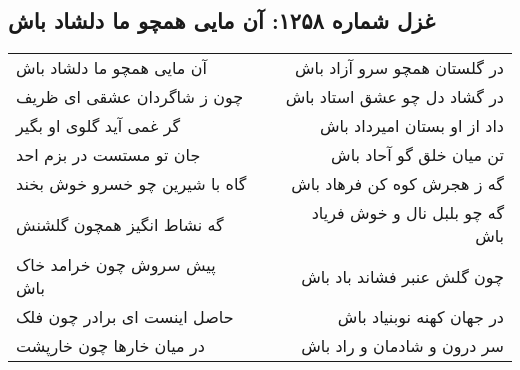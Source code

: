 \begin{center}
\section*{غزل شماره ۱۲۵۸: آن مایی همچو ما دلشاد باش}
\label{sec:1258}
\begin{longtable}{l p{0.5cm} r}
آن مایی همچو ما دلشاد باش
&&
در گلستان همچو سرو آزاد باش
\\
چون ز شاگردان عشقی ای ظریف
&&
در گشاد دل چو عشق استاد باش
\\
گر غمی آید گلوی او بگیر
&&
داد از او بستان امیرداد باش
\\
جان تو مستست در بزم احد
&&
تن میان خلق گو آحاد باش
\\
گاه با شیرین چو خسرو خوش بخند
&&
گه ز هجرش کوه کن فرهاد باش
\\
گه نشاط انگیز همچون گلشنش
&&
گه چو بلبل نال و خوش فریاد باش
\\
پیش سروش چون خرامد خاک باش
&&
چون گلش عنبر فشاند باد باش
\\
حاصل اینست ای برادر چون فلک
&&
در جهان کهنه نوبنیاد باش
\\
در میان خارها چون خارپشت
&&
سر درون و شادمان و راد باش
\\
\end{longtable}
\end{center}
